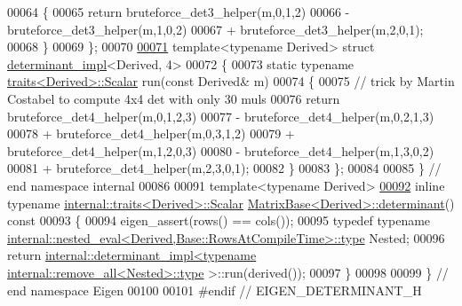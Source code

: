 \begin{DoxyCode}
00064   \{
00065     \textcolor{keywordflow}{return} bruteforce\_det3\_helper(m,0,1,2)
00066           - bruteforce\_det3\_helper(m,1,0,2)
00067           + bruteforce\_det3\_helper(m,2,0,1);
00068   \}
00069 \};
00070 
\hyperlink{struct_eigen_1_1internal_1_1determinant__impl_3_01_derived_00_014_01_4}{00071} \textcolor{keyword}{template}<\textcolor{keyword}{typename} Derived> \textcolor{keyword}{struct }\hyperlink{struct_eigen_1_1internal_1_1determinant__impl}{determinant\_impl}<Derived, 4>
00072 \{
00073   \textcolor{keyword}{static} \textcolor{keyword}{typename} \hyperlink{struct_eigen_1_1internal_1_1traits}{traits<Derived>::Scalar} run(\textcolor{keyword}{const} Derived& m)
00074   \{
00075     \textcolor{comment}{// trick by Martin Costabel to compute 4x4 det with only 30 muls}
00076     \textcolor{keywordflow}{return} bruteforce\_det4\_helper(m,0,1,2,3)
00077           - bruteforce\_det4\_helper(m,0,2,1,3)
00078           + bruteforce\_det4\_helper(m,0,3,1,2)
00079           + bruteforce\_det4\_helper(m,1,2,0,3)
00080           - bruteforce\_det4\_helper(m,1,3,0,2)
00081           + bruteforce\_det4\_helper(m,2,3,0,1);
00082   \}
00083 \};
00084 
00085 \} \textcolor{comment}{// end namespace internal}
00086 
00091 \textcolor{keyword}{template}<\textcolor{keyword}{typename} Derived>
\hyperlink{group___core___module_a7ad8f77004bb956b603bb43fd2e3c061}{00092} \textcolor{keyword}{inline} \textcolor{keyword}{typename} \hyperlink{struct_eigen_1_1internal_1_1traits}{internal::traits<Derived>::Scalar} 
      \hyperlink{group___core___module_a7ad8f77004bb956b603bb43fd2e3c061}{MatrixBase<Derived>::determinant}()\textcolor{keyword}{ const}
00093 \textcolor{keyword}{}\{
00094   eigen\_assert(rows() == cols());
00095   \textcolor{keyword}{typedef} \textcolor{keyword}{typename} \hyperlink{class_eigen_1_1internal_1_1_tensor_lazy_evaluator_writable}{internal::nested\_eval<Derived,Base::RowsAtCompileTime>::type}
       Nested;
00096   \textcolor{keywordflow}{return} \hyperlink{struct_eigen_1_1internal_1_1determinant__impl}{internal::determinant\_impl<typename internal::remove\_all<Nested>::type}
      >::run(derived());
00097 \}
00098 
00099 \} \textcolor{comment}{// end namespace Eigen}
00100 
00101 \textcolor{preprocessor}{#endif // EIGEN\_DETERMINANT\_H}
\end{DoxyCode}
